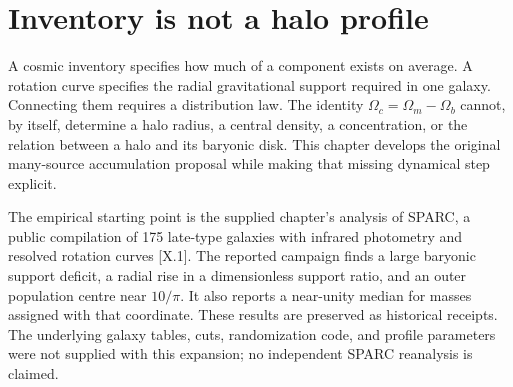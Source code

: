 \begin{abstract}
This chapter develops the many-source accumulation account of galaxy support. It preserves the reported SPARC results while separating potential lifts, radial force, and geometry-dependent mass inference. The proposed coordinate $10/\pi$ is analyzed as a population identification, with explicit treatment of selection history, uncertainty, and the algebraic dependence of the mass-ratio statistic. A radial organization law and an untouched-sample test remain necessary for a predictive halo theory. The reported support deficit, radial randomization results, and outer mass assignment are preserved with their original receipt identifiers. New derivations expose which results share the same underlying statistic, quantify the approximate resolution of the population median, and constrain admissible radial profiles through density positivity. Disk geometry, stellar mass-to-light ratios, correlated observational uncertainties, and the distinction between measured-radius and virial masses are treated explicitly. The constituent interpretation is kept separate from the gravitational support measurement. No SPARC replay or new halo-formation simulation is claimed; the chapter ends with a prospective protocol and falsifiable requirements for a completed organization law.
\end{abstract}

\section{Inventory is not a halo profile}

A cosmic inventory specifies how much of a component exists on average. A rotation curve specifies the radial gravitational support required in one galaxy. Connecting them requires a distribution law. The identity $\Omega_c=\Omega_m-\Omega_b$ cannot, by itself, determine a halo radius, a central density, a concentration, or the relation between a halo and its baryonic disk. This chapter develops the original many-source accumulation proposal while making that missing dynamical step explicit.

The empirical starting point is the supplied chapter's analysis of SPARC, a public compilation of 175 late-type galaxies with infrared photometry and resolved rotation curves [X.1]. The reported campaign finds a large baryonic support deficit, a radial rise in a dimensionless support ratio, and an outer population centre near $10/\pi$. It also reports a near-unity median for masses assigned with that coordinate. These results are preserved as historical receipts. The underlying galaxy tables, cuts, randomization code, and profile parameters were not supplied with this expansion; no independent SPARC reanalysis is claimed.

